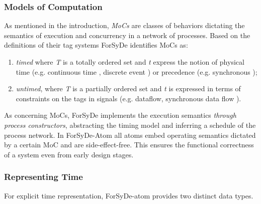\subsubsection{Models of Computation}
As mentioned in the introduction, \emph{MoCs} are classes of behaviors
 dictating the semantics of execution and concurrency in a network
 of processes. Based on the definitions of their tag systems
 ForSyDe identifies MoCs as:\par
\begin{enumerate}
\item 
\emph{timed} where \emph{T} is a totally ordered set and \emph{t} express the
 notion of physical time (e.g. continuous time
 , discrete event
 ) or precedence (e.g. synchronous
 );\par

\item 
\emph{untimed}, where \emph{T} is a partially ordered set and \emph{t} is
 expressed in terms of constraints on the tags in signals
 (e.g. dataflow, synchronous data flow
 ).\par

\end{enumerate}
As concerning MoCs, ForSyDe implements the execution semantics
 \emph{through process constructors}, abstracting the timing model and
 inferring a schedule of the process network. In ForSyDe-Atom all
 atoms embed operating semantics dictated by a certain MoC and are
 side-effect-free. This ensures the functional correctness of a
 system even from early design stages.\par

\subsubsection{Representing Time}
For explicit time representation, ForSyDe-atom provides two
 distinct data types.\par

